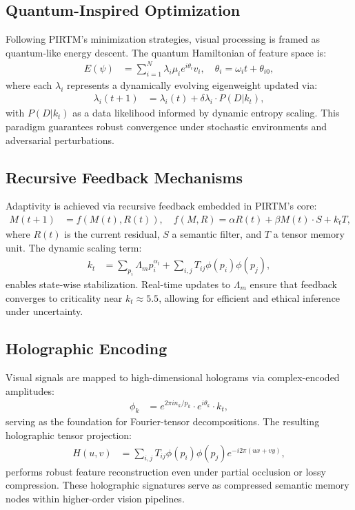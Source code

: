 \documentclass{article}
\theoremstyle{plain}
\begin{document}
\subsection{Quantum-Inspired Optimization}
Following PIRTM's minimization strategies, visual processing is framed as quantum-like energy descent. The quantum Hamiltonian of feature space is:
\begin{align}
E(\psi) &= \sum_{i=1}^N \lambda_i \mu_i e^{i \theta_i} v_i, \quad \theta_i = \omega_i t + \theta_{i0},
\end{align}
where each \(\lambda_i\) represents a dynamically evolving eigenweight updated via:
\begin{align}
\lambda_i(t+1) &= \lambda_i(t) + \delta \lambda_i \cdot P(D | k_t),
\end{align}
with \(P(D | k_t)\) as a data likelihood informed by dynamic entropy scaling. This paradigm guarantees robust convergence under stochastic environments and adversarial perturbations.

\subsection{Recursive Feedback Mechanisms}
Adaptivity is achieved via recursive feedback embedded in PIRTM’s core:
\begin{align}
M(t+1) &= f(M(t), R(t)), \quad f(M, R) = \alpha R(t) + \beta M(t) \cdot S + k_t T,
\end{align}
where \(R(t)\) is the current residual, \(S\) a semantic filter, and \(T\) a tensor memory unit. The dynamic scaling term:
\begin{align}
k_t &= \sum_{p_i} \Lambda_m p_i^{\alpha_t} + \sum_{i,j} T_{ij} \phi(p_i) \phi(p_j),
\end{align}
enables state-wise stabilization. Real-time updates to \(\Lambda_m\) ensure that feedback converges to criticality near \(k_t \approx 5.5\), allowing for efficient and ethical inference under uncertainty.

\subsection{Holographic Encoding}
Visual signals are mapped to high-dimensional holograms via complex-encoded amplitudes:
\begin{align}
\phi_k &= e^{2 \pi i n_k / p_k} \cdot e^{i \theta_k} \cdot k_t,
\end{align}
serving as the foundation for Fourier-tensor decompositions. The resulting holographic tensor projection:
\begin{align}
H(u, v) &= \sum_{i,j} T_{ij} \phi(p_i) \phi(p_j) e^{-i 2\pi (ux + vy)},
\end{align}
performs robust feature reconstruction even under partial occlusion or lossy compression. These holographic signatures serve as compressed semantic memory nodes within higher-order vision pipelines.
\end{document}
